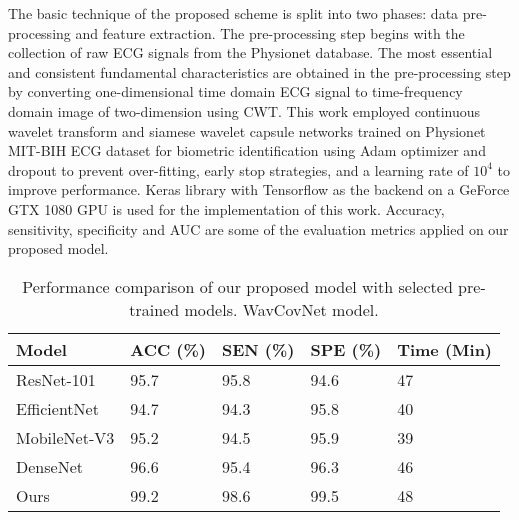 \documentclass{standalone}
\begin{document}
The basic technique of the proposed scheme is split into two phases: data pre-processing and feature extraction. The pre-processing step begins with the collection of raw ECG signals from the Physionet database. The most essential and consistent fundamental characteristics are obtained in the pre-processing step by converting one-dimensional time domain ECG signal to time-frequency domain image of two-dimension using CWT. This work employed continuous wavelet transform and siamese wavelet capsule networks trained on Physionet MIT-BIH ECG dataset for biometric identification using Adam optimizer and dropout to prevent over-fitting, early stop strategies, and a learning rate of $10^{4}$ to improve performance. Keras library with Tensorflow as the backend on a GeForce GTX 1080 GPU is used for the implementation of this work. Accuracy, sensitivity, specificity and AUC are some of the evaluation metrics applied on our proposed model. 

\begin{table}[]
\caption{Performance comparison of our proposed model with selected pre-trained models.
WavCovNet model.}
\begin{tabular}{lllll}
\toprule
\multicolumn{1}{l}{Model} & \multicolumn{1}{l}{ACC (\%)} & \multicolumn{1}{l}{SEN (\%)} & \multicolumn{1}{l}{SPE (\%)} & \multicolumn{1}{l}{Time (Min)} \\ \hline
\midrule
ResNet-101                  & 95.7                         & 95.8                         & 94.6                         & 47                              \\
EfficientNet                & 94.7                         & 94.3                         & 95.8                         & 40                              \\
MobileNet-V3                & 95.2                         & 94.5                         & 95.9                         & 39                              \\
DenseNet                    & 96.6                         & 95.4                         & 96.3                         & 46                              \\ 
\multicolumn{1}{l}{Ours}  & \multicolumn{1}{l}{99.2}    & \multicolumn{1}{l}{98.6}    & \multicolumn{1}{l}{99.5}    & \multicolumn{1}{l}{48}         \\ \hline
\bottomrule
\end{tabular}
\label{tab6}
\end{table}
\end{document}
